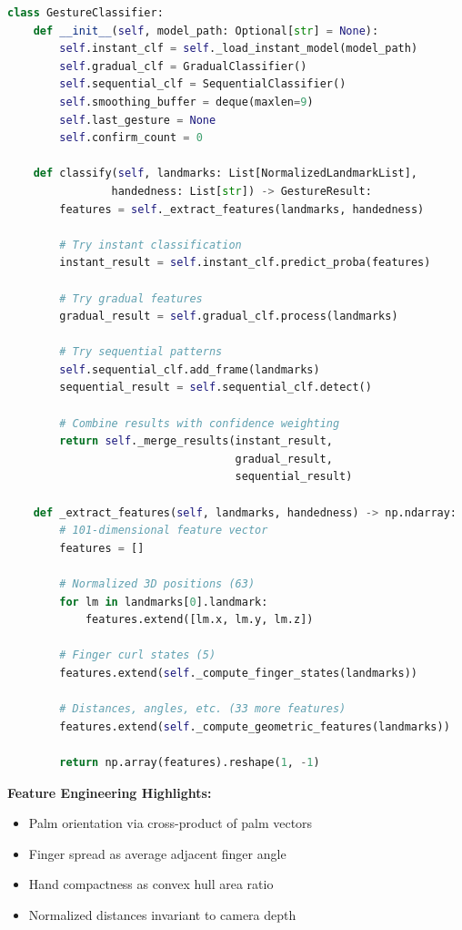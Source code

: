 \documentclass[11pt,a4paper]{article}
\begin{document}
\begin{lstlisting}[language=Python]
class GestureClassifier:
    def __init__(self, model_path: Optional[str] = None):
        self.instant_clf = self._load_instant_model(model_path)
        self.gradual_clf = GradualClassifier()
        self.sequential_clf = SequentialClassifier()
        self.smoothing_buffer = deque(maxlen=9)
        self.last_gesture = None
        self.confirm_count = 0
    
    def classify(self, landmarks: List[NormalizedLandmarkList],
                handedness: List[str]) -> GestureResult:
        features = self._extract_features(landmarks, handedness)
        
        # Try instant classification
        instant_result = self.instant_clf.predict_proba(features)
        
        # Try gradual features
        gradual_result = self.gradual_clf.process(landmarks)
        
        # Try sequential patterns
        self.sequential_clf.add_frame(landmarks)
        sequential_result = self.sequential_clf.detect()
        
        # Combine results with confidence weighting
        return self._merge_results(instant_result, 
                                   gradual_result, 
                                   sequential_result)
    
    def _extract_features(self, landmarks, handedness) -> np.ndarray:
        # 101-dimensional feature vector
        features = []
        
        # Normalized 3D positions (63)
        for lm in landmarks[0].landmark:
            features.extend([lm.x, lm.y, lm.z])
        
        # Finger curl states (5)
        features.extend(self._compute_finger_states(landmarks))
        
        # Distances, angles, etc. (33 more features)
        features.extend(self._compute_geometric_features(landmarks))
        
        return np.array(features).reshape(1, -1)
\end{lstlisting}

\textbf{Feature Engineering Highlights:}
\begin{itemize}
\item Palm orientation via cross-product of palm vectors
\item Finger spread as average adjacent finger angle
\item Hand compactness as convex hull area ratio
\item Normalized distances invariant to camera depth
\end{itemize}
\end{document}
